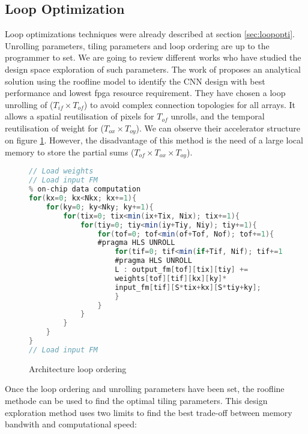 \subsection{Loop Optimization} \label{subsec:loopopti}
Loop optimizations techniques were already described at section \ref{sec:loopopti}. Unrolling parameters, tiling parameters and loop ordering are up to the programmer to set. We are going to review different works who have studied the design space exploration of such parameters. \newline \newline
%
The work of \cite{zhang_optimizing_2015} proposes an analytical solution using the roofline model \cite{williams_roofline_2009} to identify the CNN design with best performance and lowest \acrshort{fpga} resource requirement. They have chosen a loop unrolling of ($T_{if} \times T_{of}$) to avoid complex connection topologies for all arrays. It allows a spatial reutilisation of pixels for $T_{of}$ unrolls, and the temporal reutilisation of weight for ($T_{ox} \times T_{oy}$). We can observe their accelerator structure on figure \ref{lst:accelerator}. However, the disadvantage of this method is the need of a large local memory to store the partial sums ($T_{of} \times T_{ox} \times T_{oy}$).
%
\begin{figure}
    \centering
    \begin{lstlisting}[language=Java]
// Load weights
// Load input FM
% on-chip data computation
for(kx=0; kx<Nkx; kx+=1){
    for(ky=0; ky<Nky; ky+=1){
        for(tix=0; tix<min(ix+Tix, Nix); tix+=1){
            for(tiy=0; tiy<min(iy+Tiy, Niy); tiy+=1){
                for(tof=0; tof<min(of+Tof, Nof); tof+=1){
                #pragma HLS UNROLL
                    for(tif=0; tif<min(if+Tif, Nif); tif+=1){
                    #pragma HLS UNROLL
                    L : output_fm[tof][tix][tiy] +=
                    weights[tof][tif][kx][ky]*
                    input_fm[tif][S*tix+kx][S*tiy+ky];
                    }
                }
            }
        }
    }
}
// Load input FM
    \end{lstlisting}
    \label{lst:accelerator}
    \caption{Architecture loop ordering \cite{zhang_optimizing_2015}}
\end{figure} \newline
%
Once the loop ordering and unrolling parameters have been set, the roofline methode can be used to find the optimal tiling parameters. This design exploration method uses two limits to find the best trade-off between memory bandwith and computational speed:
